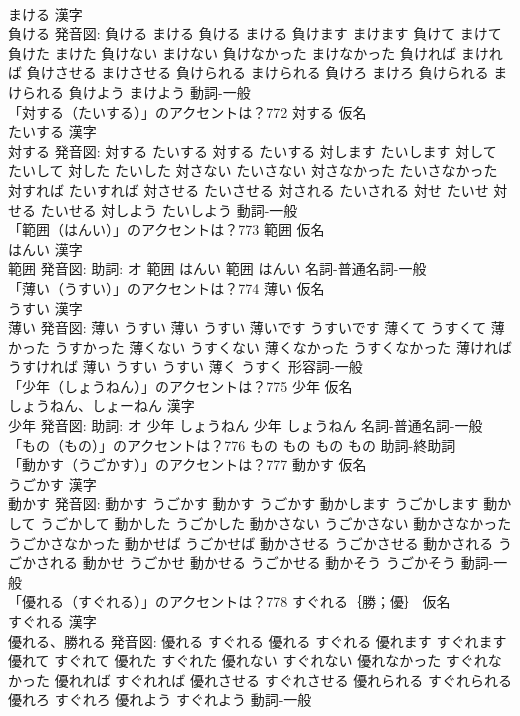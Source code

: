 \documentclass[8pt]{extreport}
\begin{document}
\begin{CJK}{UTF8}{min}
\\	まける 漢字　
\\	負ける 発音図:	負ける まける		負ける まける 負けます まけます 負けて まけて 負けた まけた 負けない まけない 負けなかった まけなかった 負ければ まければ 負けさせる まけさせる 負けられる まけられる 負けろ まけろ 負けられる まけられる 負けよう まけよう				動詞-一般 
\\	「対する（たいする）」のアクセントは？772	対する 仮名　
\\	たいする 漢字　
\\	対する 発音図:	対する たいする		対する たいする 対します たいします 対して たいして 対した たいした 対さない たいさない 対さなかった たいさなかった 対すれば たいすれば 対させる たいさせる 対される たいされる 対せ たいせ 対せる たいせる 対しよう たいしよう				動詞-一般 
\\	「範囲（はんい）」のアクセントは？773	範囲 仮名　
\\	はんい 漢字　
\\	範囲 発音図: 助詞: オ	範囲 はんい		範囲 はんい				名詞-普通名詞-一般 
\\	「薄い（うすい）」のアクセントは？774	薄い 仮名　
\\	うすい 漢字　
\\	薄い 発音図:	薄い うすい		薄い うすい 薄いです うすいです 薄くて うすくて 薄かった うすかった 薄くない うすくない 薄くなかった うすくなかった 薄ければ うすければ 薄い うすい うすい 薄く うすく				形容詞-一般 
\\	「少年（しょうねん）」のアクセントは？775	少年 仮名　
\\	しょうねん、しょーねん 漢字　
\\	少年 発音図: 助詞: オ	少年 しょうねん		少年 しょうねん				名詞-普通名詞-一般 
\\	「もの（もの）」のアクセントは？776		もの もの		もの もの				助詞-終助詞 
\\	「動かす（うごかす）」のアクセントは？777	動かす 仮名　
\\	うごかす 漢字　
\\	動かす 発音図:	動かす うごかす		動かす うごかす 動かします うごかします 動かして うごかして 動かした うごかした 動かさない うごかさない 動かさなかった うごかさなかった 動かせば うごかせば 動かさせる うごかさせる 動かされる うごかされる 動かせ うごかせ 動かせる うごかせる 動かそう うごかそう				動詞-一般 
\\	「優れる（すぐれる）」のアクセントは？778	すぐれる｛勝；優｝ 仮名　
\\	すぐれる 漢字　
\\	優れる、勝れる 発音図:	優れる すぐれる		優れる すぐれる 優れます すぐれます 優れて すぐれて 優れた すぐれた 優れない すぐれない 優れなかった すぐれなかった 優れれば すぐれれば 優れさせる すぐれさせる 優れられる すぐれられる 優れろ すぐれろ 優れよう すぐれよう				動詞-一般 

\end{CJK}
\end{document}

